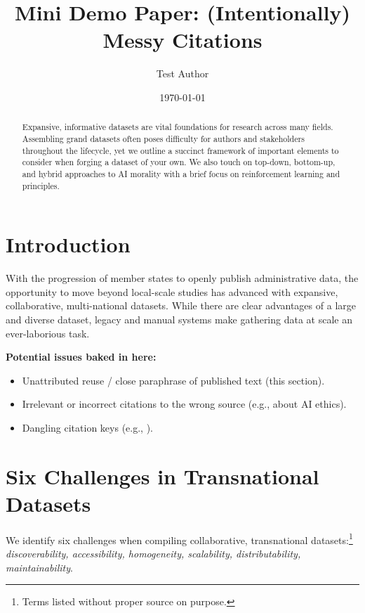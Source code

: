 \documentclass[11pt]{article}
\title{Mini Demo Paper: (Intentionally) Messy Citations}
\author{Test Author}
\date{\today}
\begin{document}
\maketitle

\begin{abstract}
Expansive, informative datasets are vital foundations for research across many fields.
Assembling grand datasets often poses difficulty for authors and stakeholders throughout the lifecycle,
yet we outline a succinct framework of important elements to consider when forging a dataset of your own. %
We also touch on top-down, bottom-up, and hybrid approaches to AI morality with a brief focus on reinforcement learning and principles. %
\end{abstract}

\section{Introduction}
With the progression of member states to openly publish administrative data, the opportunity to move beyond local-scale studies has advanced with expansive, collaborative, multi-national datasets.%
While there are clear advantages of a large and diverse dataset, legacy and manual systems make gathering data at scale an ever-laborious task. %

\textbf{Potential issues baked in here:}
\begin{itemize}
  \item Unattributed reuse / close paraphrase of published text (this section).
  \item Irrelevant or incorrect citations to the wrong source (e.g., \cite{Eurocrops2021} about AI ethics).
  \item Dangling citation keys (e.g., \cite{NonExistingKey}).
\end{itemize}

\section{Six Challenges in Transnational Datasets}
We identify six challenges when compiling collaborative, transnational datasets:\footnote{Terms listed without proper source on purpose.}
\emph{discoverability, accessibility, homogeneity, scalability, distributability, maintainability}. %
\end{document}
